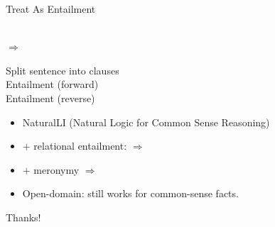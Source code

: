 \documentclass[hyperref]{beamer}
\begin{document}
\begin{frame}{Treat As Entailment}
\begin{center}
   \\ $\Rightarrow$ 
\end{center}

 Split sentence into clauses \\
 Entailment (forward) \\
 Entailment (reverse)
\begin{itemize}
  \item NaturalLI (Natural Logic for Common Sense Reasoning)
  \pause
  \item[] $+$ relational entailment:  $\Rightarrow$ 
  \pause
  \item[] $+$ meronymy  $\Rightarrow$ 
  \pause
  \item Open-domain: still works for common-sense facts.
\end{itemize}
\pause

\vspace{0.5cm}
\begin{center}
  \large{Thanks!}
\end{center}
\end{frame}
\end{document}

